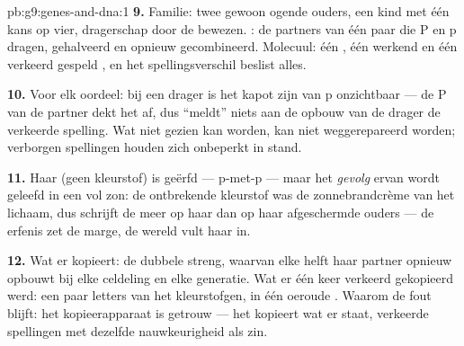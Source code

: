 \begin{solution}{pb:g9:genes-and-dna:1}
\textbf{9.} Familie: twee gewoon ogende ouders, een kind met één
kans op vier, dragerschap door de  bewezen. :
de partners van één paar die P en p dragen, gehalveerd en
opnieuw gecombineerd. Molecuul: één , één werkend en één
verkeerd gespeld , en het spellingsverschil beslist alles.

\textbf{10.} Voor elk oordeel: bij een drager is het kapot zijn
van p onzichtbaar --- de P van de partner dekt het af, dus
``meldt'' niets aan de opbouw van de drager de verkeerde
spelling. Wat niet gezien kan worden, kan niet weggerepareerd
worden; verborgen spellingen houden zich onbeperkt in stand.

\textbf{11.} Haar  (geen kleurstof) is geërfd ---
p-met-p --- maar het \emph{gevolg} ervan wordt geleefd in een
 vol zon: de ontbrekende kleurstof was de zonnebrandcrème
van het lichaam, dus schrijft de  meer op haar dan op
haar afgeschermde ouders --- de erfenis zet de marge, de wereld
vult haar in.

\textbf{12.} Wat er kopieert: de dubbele streng, waarvan elke
helft haar partner opnieuw opbouwt bij elke celdeling en elke
generatie. Wat er één keer verkeerd gekopieerd werd: een paar
letters van het kleurstofgen, in één oeroude . Waarom
de fout blijft: het kopieerapparaat is getrouw --- het kopieert
wat er staat, verkeerde spellingen met dezelfde nauwkeurigheid
als zin.
\end{solution}
